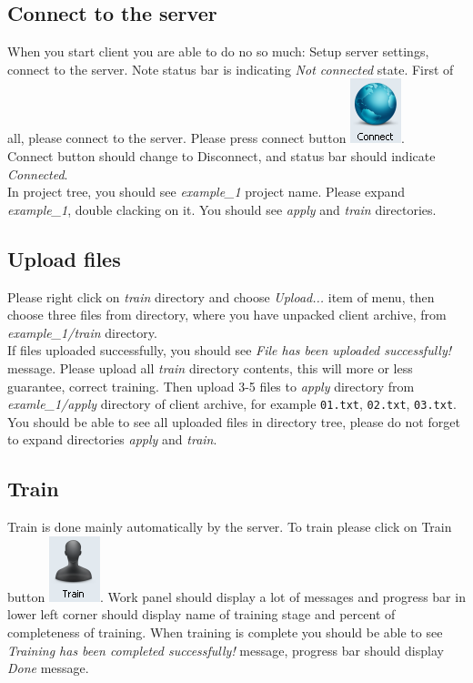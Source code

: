 \documentclass[12pt]{article}
\begin{document}
\subsection{Connect to the server}
When you start client you are able to do no so much: Setup server settings, connect to the server. Note status bar is indicating \emph{Not connected} state. First of all, please  connect to the server. Please press connect button \includegraphics[scale=0.6]{02ConnectButton.png}.\\
Connect button should change to Disconnect, and status bar should indicate \emph{Connected}.\\
In project tree, you should see \emph{example\_1} project name. Please expand \emph{example\_1}, double clacking on it. You should see \emph{apply} and \emph{train} directories.

\subsection{Upload files}
Please right click on \emph{train} directory and choose \emph{Upload...} item of menu, then choose three files from directory, where you have unpacked client archive, from \emph{example\_1/train} directory.\\
If files uploaded successfully, you should see \emph{File has been uploaded successfully!} message. Please upload all \emph{train} directory contents, this will more or less guarantee, correct training. Then upload 3-5 files to \emph{apply} directory from \emph{examle\_1/apply} directory of client archive, for example \texttt{01.txt}, \texttt{02.txt}, \texttt{03.txt}. You should be able to see all uploaded files in directory tree, please do not forget to expand directories \emph{apply} and \emph{train}.

\subsection{Train}
Train is done mainly automatically by the server. To train please click on Train button \includegraphics[scale=0.6]{03TrainButton.png}. Work panel should display a lot of messages and progress bar in lower left corner should display name of training stage and percent of completeness of training. When training is complete you should be able to see \emph{Training has been completed successfully!} message, progress bar should display \emph{Done} message.
\end{document}
